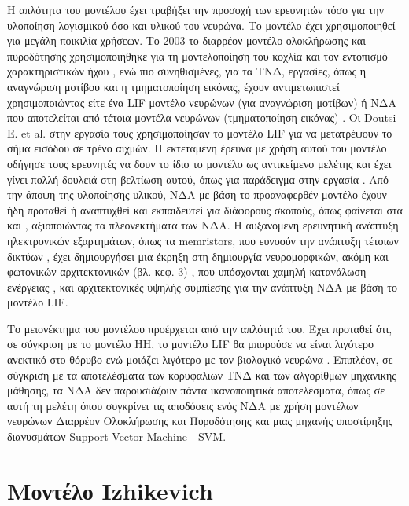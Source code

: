 \documentclass[12pt]{report}
\begin{document}
Η απλότητα του μοντέλου έχει τραβήξει την προσοχή των ερευνητών τόσο για την υλοποίηση λογισμικού όσο και υλικού του νευρώνα. Το μοντέλο έχει χρησιμοποιηθεί για μεγάλη ποικιλία χρήσεων. Το 2003 το διαρρέον μοντέλο ολοκλήρωσης και πυροδότησης χρησιμοποιήθηκε για τη μοντελοποίηση του κοχλία και τον εντοπισμό χαρακτηριστικών ήχου \cite{sound2003}, ενώ πιο συνηθισμένες, για τα ΤΝΔ, εργασίες, όπως η αναγνώριση μοτίβου και η τμηματοποίηση εικόνας, έχουν αντιμετωπιστεί χρησιμοποιώντας είτε ένα \textlatin{LIF} μοντέλο νευρώνων (για αναγνώριση μοτίβων) \cite{pattern2007} ή ΝΔΑ που αποτελείται από τέτοια μοντέλα νευρώνων (τμηματοποίηση εικόνας) \cite{Chaturvedi2012}. Οι \textlatin{Doutsi E. et al.} στην εργασία τους \cite{Doutsi2021} χρησιμοποίησαν το μοντέλο \textlatin{LIF} για να μετατρέψουν το σήμα εισόδου σε τρένο αιχμών. Η εκτεταμένη έρευνα με χρήση αυτού του μοντέλο οδήγησε τους ερευνητές να δουν το ίδιο το μοντέλο ως αντικείμενο μελέτης και έχει γίνει πολλή δουλειά στη βελτίωση αυτού, όπως για παράδειγμα στην εργασία \cite{Mullowney2008}. Από την άποψη της υλοποίησης υλικού, ΝΔΑ με βάση το προαναφερθέν μοντέλο έχουν ήδη προταθεί ή αναπτυχθεί και εκπαιδευτεί για διάφορους σκοπούς, όπως φαίνεται στα \cite{Liu2019} και \cite{Chu2015}, αξιοποιώντας τα πλεονεκτήματα των ΝΔΑ. Η αυξανόμενη ερευνητική ανάπτυξη ηλεκτρονικών εξαρτημάτων, όπως τα \textlatin{memristors}, που ευνοούν την ανάπτυξη τέτοιων δικτύων \cite{Yang2020}, έχει δημιουργήσει μια έκρηξη στη δημιουργία νευρομορφικών, ακόμη και φωτονικών αρχιτεκτονικών (βλ. κεφ. 3) \cite{Nahmias2013}, που υπόσχονται χαμηλή κατανάλωση ενέργειας \cite{Liu2019}, \cite{Chatterjee2019} και αρχιτεκτονικές υψηλής συμπίεσης \cite{Rozenberg2019} για την ανάπτυξη ΝΔΑ με βάση το μοντέλο \textlatin{LIF}.

Το μειονέκτημα του μοντέλου προέρχεται από την απλότητά του. Έχει προταθεί ότι, σε σύγκριση με το μοντέλο \textlatin{HH}, το μοντέλο \textlatin{LIF} θα μπορούσε να είναι λιγότερο ανεκτικό στο θόρυβο ενώ μοιάζει λιγότερο με τον βιολογικό νευρώνα \cite{subthreshold2005}. Επιπλέον, σε σύγκριση με τα αποτελέσματα των κορυφαλιων ΤΝΔ και των αλγορίθμων μηχανικής μάθησης, τα ΝΔΑ δεν παρουσιάζουν πάντα ικανοποιητικά αποτελέσματα, όπως σε αυτή τη μελέτη \cite{SVM2014} όπου συγκρίνει τις αποδόσεις ενός ΝΔΑ με χρήση μοντέλων νευρώνων Διαρρέον Ολοκλήρωσης και Πυροδότησης και μιας μηχανής υποστίρηξης διανυσμάτων \textlatin{Support Vector Machine - SVM}.

\medskip

\section{Μοντέλο \textlatin{Izhikevich}}
\end{document}
